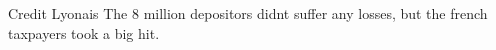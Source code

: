 Credit Lyonais
The 8 million depositors didnt suffer any losses, but the french taxpayers took a big hit.
